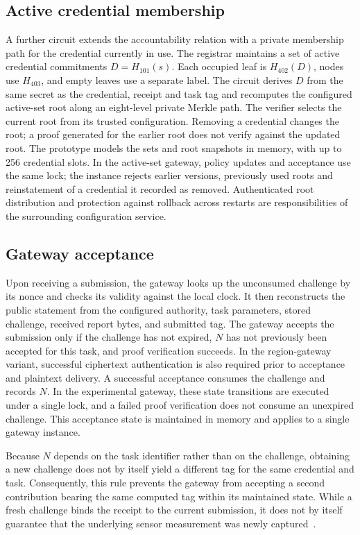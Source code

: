 \documentclass[pdflatex,iicol,sn-mathphys-num]{sn-jnl}
\begin{document}
\subsection{Active credential membership}
A further circuit extends the accountability relation with a private membership path for the credential currently in use. The registrar maintains a set of active credential commitments $D=H_{101}(s)$. Each occupied leaf is $H_{402}(D)$, nodes use $H_{403}$, and empty leaves use a separate label. The circuit derives $D$ from the same secret as the credential, receipt and task tag and recomputes the configured active-set root along an eight-level private Merkle path. The verifier selects the current root from its trusted configuration. Removing a credential changes the root; a proof generated for the earlier root does not verify against the updated root. The prototype models the sets and root snapshots in memory, with up to 256 credential slots. In the active-set gateway, policy updates and acceptance use the same lock; the instance rejects earlier versions, previously used roots and reinstatement of a credential it recorded as removed. Authenticated root distribution and protection against rollback across restarts are responsibilities of the surrounding configuration service.

\subsection{Gateway acceptance}
\label{sec:acceptance}

Upon receiving a submission, the gateway looks up the unconsumed challenge by its nonce and checks its validity against the local clock. It then reconstructs the public statement from the configured authority, task parameters, stored challenge, received report bytes, and submitted tag. The gateway accepts the submission only if the challenge has not expired, $N$ has not previously been accepted for this task, and proof verification succeeds. In the region-gateway variant, successful ciphertext authentication is also required prior to acceptance and plaintext delivery. A successful acceptance consumes the challenge and records $N$. In the experimental gateway, these state transitions are executed under a single lock, and a failed proof verification does not consume an unexpired challenge. This acceptance state is maintained in memory and applies to a single gateway instance.

Because $N$ depends on the task identifier rather than on the challenge, obtaining a new challenge does not by itself yield a different tag for the same credential and task. Consequently, this rule prevents the gateway from accepting a second contribution bearing the same computed tag within its maintained state. While a fresh challenge binds the receipt to the current submission, it does not by itself guarantee that the underlying sensor measurement was newly captured~\cite{Birkholz2023RATS}.
\end{document}
